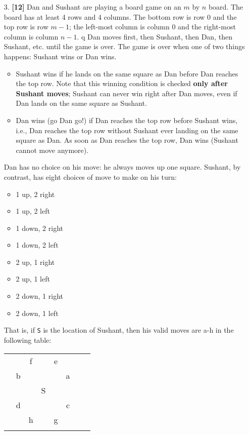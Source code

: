 \documentclass{assignment-263}
\begin{document}
\begin{enumerate}
\item[3.] \textbf{[12]} 
		Dan and Sushant are playing a board game on an $m$ by $n$ board. The
		board has at least 4 rows and 4 columns. The bottom row is row 0 and
		the top row is row $m-1$; the left-most column is column 0 and the
		right-most column is column $n-1$.
q
		Dan moves first, then Sushant, then Dan, then Sushant, etc. until the
		game is over. The game is over when one of two things happens: Sushant
		wins or Dan wins.

		\begin{itemize}
			\item Sushant wins if he lands on the same square as Dan before
				Dan reaches the top row. Note that this winning condition is
				checked {\bf only after Sushant moves}; Sushant can never win
				right after Dan moves, even if Dan lands on the same square
				as Sushant.
			\item Dan wins (go Dan go!) if Dan reaches the top row before
				Sushant wins, i.e., Dan reaches the top row without Sushant ever
				landing on the same square as Dan. As soon as Dan reaches
				the top row, Dan wins (Sushant cannot move anymore).
		\end{itemize}

		Dan has no choice on his move: he always moves up one square.
		 		Sushant, by contrast, has eight choices of move to make on his turn:
		\begin{itemize}
			\item 1 up, 2 right
			\item 1 up, 2 left
			\item 1 down, 2 right
			\item 1 down, 2 left
			\item 2 up, 1 right
			\item 2 up, 1 left
			\item 2 down, 1 right
			\item 2 down, 1 left
		\end{itemize}

		That is, if \verb|S| is the location of Sushant, then his valid moves
		are a-h in the following table:

		\begin{center}
			\begin{tabular}{ | c | c | c | c | c | c | c | c | }
				\hline
				&  &  &  &  &  &  \\ \hline
				&  & f &  & e &  &   \\ \hline
				& b &  &  &  & a &   \\ \hline
				&  &  & S &  &  &   \\ \hline
				& d &  &  &  & c &   \\ \hline
				&  & h &  & g &  &   \\ \hline
				&  &  &  &  &  &   \\ \hline
			\end{tabular}
		\end{center}


\end{enumerate}
\end{document}
